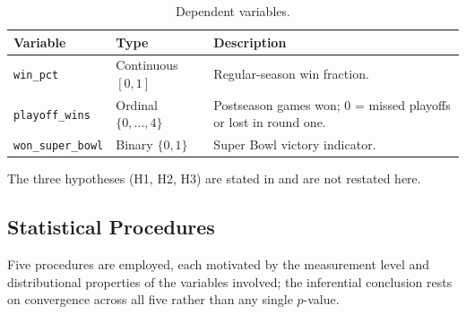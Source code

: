 \documentclass[12pt,a4paper]{article}
\begin{document}
\begin{table}[htbp]
  \centering
  \caption{Dependent variables.}
  \label{tab:dvs}
  \begin{tabularx}{\textwidth}{llX}
    \toprule
    \textbf{Variable} & \textbf{Type} & \textbf{Description} \\
    \midrule
    \texttt{win\_pct} & Continuous $[0,1]$ & Regular-season win fraction. \\[6pt]
    \texttt{playoff\_wins} & Ordinal $\{0,\dots,4\}$ & Postseason games won; 0 = missed playoffs or lost in round one. \\[6pt]
    \texttt{won\_super\_bowl} & Binary $\{0,1\}$ & Super Bowl victory indicator. \\
    \bottomrule
  \end{tabularx}
\end{table}

The three hypotheses (H1, H2, H3) are stated in  and are not restated here.

\subsection{Statistical Procedures}
\label{sec:procedures}

Five procedures are employed, each motivated by the measurement level and distributional properties of the variables involved; the inferential conclusion rests on convergence across all five rather than any single $p$-value.
\end{document}
